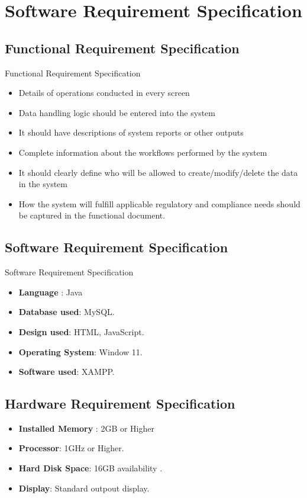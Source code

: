 \documentclass[12pt, letter paper]{report}
\begin{document}
\chapter{Software Requirement Specification}

\section{Functional Requirement Specification} 
Functional  Requirement Specification
\begin{itemize}
\item Details of operations conducted in every screen
\item Data handling logic should be entered into the system
\item It should have descriptions of system reports or other outputs
\item Complete information about the workflows performed by the system
\item It should clearly define who will be allowed to create/modify/delete the data in the system
\item How the system will fulfill applicable regulatory and compliance needs should be captured in the functional document.
\end{itemize}
\section{Software Requirement Specification}
Software Requirement Specification
\begin{itemize}
 \item {\textbf{Language} : Java}
 \item {\textbf{Database used}: MySQL}.
 \item {\textbf{Design used}: HTML, JavaScript}.
 \item {\textbf{Operating System}: Window 11}.
 \item {\textbf{Software used}: XAMPP}.
\end{itemize}

\section{Hardware Requirement Specification} 

\begin{itemize}
 \item {\textbf{Installed Memory} : 2GB or Higher}
 \item {\textbf{Processor}: 1GHz or Higher}.
 \item {\textbf{Hard Disk Space}: 16GB availability }.
 \item {\textbf{Display}: Standard outpout display}.
 \
\end{itemize}
\end{document}
